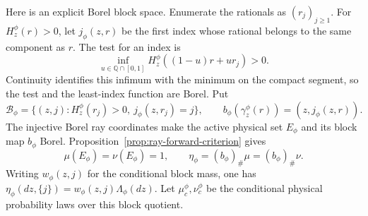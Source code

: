 \documentclass[11pt,reqno]{amsart}
\theoremstyle{definition}
\theoremstyle{remark}
\numberwithin{equation}{section}
\begin{document}
Here is an explicit Borel block space. Enumerate the rationals as
\((r_j)_{j\ge1}\). For \(H_z^\phi(r)>0\), let \(j_\phi(z,r)\)
be the first index whose rational belongs to the same component as
\(r\). The test for an index is
\begin{equation}
\label{eq:intrinsic-active-marker}
 \inf_{u\in\mathbb Q\cap[0,1]}
 H_z^\phi((1-u)r+ur_j)>0.
\end{equation}
Continuity identifies this infimum with the minimum on the compact
segment, so the test and the least-index function are Borel. Put
\[
 \mathcal B_\phi
 =\{(z,j):H_z^\phi(r_j)>0,\ j_\phi(z,r_j)=j\},\qquad
 b_\phi(\gamma_z^\phi(r))=(z,j_\phi(z,r)).
\]
The injective Borel ray coordinates make the active physical set
\(E_\phi\) and its block map \(b_\phi\) Borel.
Proposition~\ref{prop:ray-forward-criterion} gives
\begin{equation}
\label{eq:intrinsic-active-quotient}
 \mu(E_\phi)=\nu(E_\phi)=1,\qquad
 \eta_\phi=(b_\phi)_\#\mu=(b_\phi)_\#\nu.
\end{equation}
Writing \(w_\phi(z,j)\) for the conditional block mass, one has
\(\eta_\phi(dz,\{j\})=w_\phi(z,j)\Lambda_\phi(dz)\).
Let \(\mu_c^\phi,\nu_c^\phi\) be the conditional physical
probability laws over this block quotient.
\end{document}
